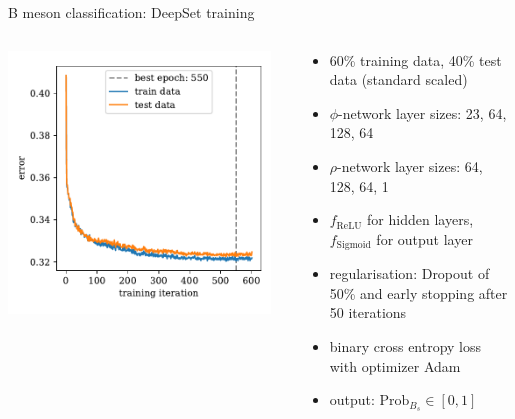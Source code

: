 \documentclass[aspectratio=1610, 10pt]{beamer}
\begin{document}
\begin{frame}{B meson classification: DeepSet training}
  
  \begin{columns}
    \begin{column}{0.4\textwidth}
      \centering
      \includegraphics[width=0.95\textwidth]{images/B_history_error.pdf}
    \end{column}
    \begin{column}{0.6\textwidth}
      \begin{itemize}
        \item 60\% training data, 40\% test data (standard scaled)
        \item $\phi$-network layer sizes: 23, 64, 128, 64
        \item $\rho$-network layer sizes: 64, 128, 64, 1
        \item $f_\text{ReLU}$ for hidden layers, $f_\text{Sigmoid}$ for output layer 
        \item regularisation: Dropout of 50\% and early stopping after 50 iterations 
        \item binary cross entropy loss with optimizer Adam
        \item output: $\text{Prob}_{B_s} \in [0,1]$
      \end{itemize}
    \end{column}
  \end{columns}
\end{frame}
\end{document}
